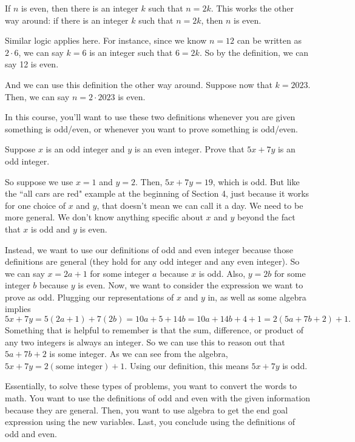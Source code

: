 \documentclass[11pt]{scrartcl}
\begin{document}
\begin{definition}
If $n$ is even, then there is an integer $k$ such that $n = 2k$. This works the other way around: if there is an integer $k$ such that $n = 2k$, then $n$ is even.
\end{definition}
Similar logic applies here. For instance, since we know $n = 12$ can be written as $2 \cdot 6$, we can say $k = 6$ is an integer such that $6 = 2k$. So by the definition, we can say 12 is even.

And we can use this definition the other way around. Suppose now that $k = 2023$. Then, we can say $n = 2 \cdot 2023$ is even.

In this course, you'll want to use these two definitions whenever you are given something is odd/even, or whenever you want to prove something is odd/even.

\begin{example}
    Suppose $x$ is an odd integer and $y$ is an even integer. Prove that $5x + 7y$ is an odd integer.
\end{example}
So suppose we use $x = 1$ and $y = 2$. Then, $5x + 7y = 19$, which is odd. But like the ``all cars are red" example at the beginning of Section 4, just because it works for one choice of $x$ and $y$, that doesn't mean we can call it a day. We need to be more general. We don't know anything specific about $x$ and $y$ beyond the fact that $x$ is odd and $y$ is even.

Instead, we want to use our definitions of odd and even integer because those definitions are general (they hold for any odd integer and any even integer). So we can say $x = 2a + 1$ for some integer $a$ because $x$ is odd. Also, $y = 2b$ for some integer $b$ because $y$ is even. Now, we want to consider the expression we want to prove as odd. Plugging our representations of $x$ and $y$ in, as well as some algebra implies \[5x + 7y = 5(2a + 1) + 7(2b) = 10a + 5 + 14b = 10a + 14b + 4 + 1 = 2(5a + 7b + 2) + 1.\] Something that is helpful to remember is that the sum, difference, or product of any two integers is always an integer. So we can use this to reason out that $5a + 7b + 2$ is some integer. As we can see from the algebra, $5x + 7y = 2(\text{some integer}) + 1$. Using our definition, this means $5x + 7y$ is odd.

\begin{advice}
Essentially, to solve these types of problems, you want to convert the words to math. You want to use the definitions of odd and even with the given information because they are general. Then, you want to use algebra to get the end goal expression using the new variables. Last, you conclude using the definitions of odd and even.
\end{advice}
\end{document}
